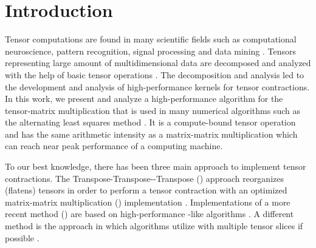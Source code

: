 \section{Introduction}
\label{sec:introduction}
Tensor computations are found in many scientific fields such as computational neuroscience, pattern recognition, signal processing and data mining \cite{karahan:2015:tensor, papalexakis:2017:tensors}.
Tensors representing large amount of multidimensional data are decomposed and analyzed with the help of basic tensor operations \cite{lee:2018:fundamental, kolda:2009:decompositions}. 
The decomposition and analysis led to the development and analysis of high-performance kernels for tensor contractions.
In this work, we present and analyze a high-performance algorithm for the tensor-matrix multiplication that is used in many numerical algorithms such as the alternating least squares method \cite{lee:2018:fundamental, kolda:2009:decompositions}.
It is a compute-bound tensor operation and has the same arithmetic intensity as a matrix-matrix multiplication which can reach near peak performance of a computing machine. 

To our best knowledge, there has been three main approach to implement tensor contractions.
The Transpose-Transpose--Transpose () approach reorganizes (flatens) tensors in order to perform a tensor contraction with an optimized matrix-matrix multiplication () implementation \cite{bader:2006:algorithm862,solomonik:2013:cyclops}.
Implementations of a more recent method () are based on high-performance -like algorithms \cite{springer:2018:design,matthews:2018:high,abadi:2016:tensorflow}.
A different method is the  approach in which algorithms utilize  with multiple tensor slices if possible \cite{dinapoli:2014:towards.efficient.use, li:2015:input, shi:2016:tensor.contraction}.


